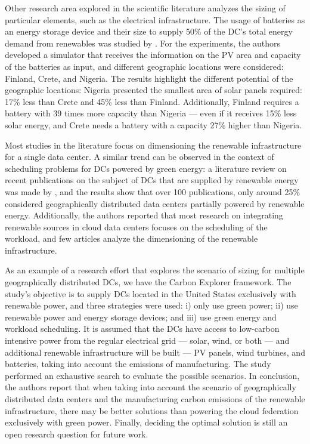 Other research area explored in the scientific literature analyzes the sizing of particular elements, such as the electrical infrastructure. The usage of batteries as an energy storage device and their size to supply 50\% of the DC's total energy demand from renewables was studied by \citet{sheme2018_batsize}. For the experiments, the authors developed a simulator that receives the information on the PV area and capacity of the batteries as input, and different geographic locations were considered: Finland, Crete, and Nigeria. The results highlight the different potential of the geographic locations: Nigeria presented the smallest area of solar panels required: 17\% less than Crete and 45\% less than Finland. Additionally, Finland requires a battery with 39 times more capacity than Nigeria --- even if it receives 15\% less solar energy, and Crete needs a battery with a capacity 27\% higher than Nigeria.


Most studies in the literature focus on dimensioning the renewable infrastructure for a single data center. A similar trend can be observed in the context of scheduling problems for DCs powered by green energy:  a literature review on recent publications on the subject of DCs that are supplied by renewable energy was made by \citet{SONG2022326}, and the results show that over 100 publications, only around 25\% considered geographically distributed data centers partially powered by renewable energy. Additionally, the authors reported that most research on integrating renewable sources in cloud data centers focuses on the scheduling of the workload, and few articles analyze the dimensioning of the renewable infrastructure.


As an example of a research effort that explores the scenario of sizing for multiple geographically distributed DCs, we have the Carbon Explorer framework\cite{acun2022holistic}. The study's objective is to supply DCs located in the United States exclusively with renewable power, and three strategies were used: i) only use green power; ii) use renewable power and energy storage devices; and iii) use green energy and workload scheduling. It is assumed that the DCs have access to low-carbon intensive power from the regular electrical grid --- solar, wind, or both --- and additional renewable infrastructure will be built --- PV panels, wind turbines, and batteries, taking into account the emissions of manufacturing. The study performed an exhaustive search to evaluate the possible scenarios. In conclusion, the authors report that when taking into account the scenario of geographically distributed data centers and the manufacturing carbon emissions of the renewable infrastructure, there may be better solutions than powering the cloud federation exclusively with green power. Finally, deciding the optimal solution is still an open research question for future work.


